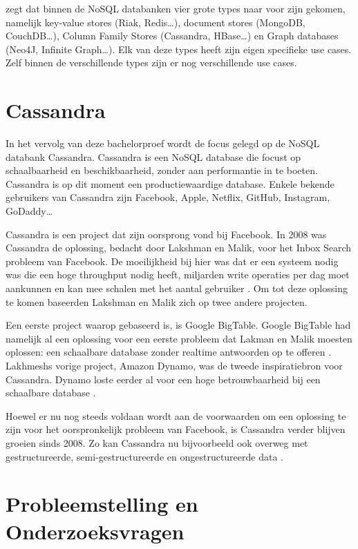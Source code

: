 \cite{Sadalage2014OverviewNoSQL} zegt dat binnen de NoSQL databanken vier grote types naar voor zijn gekomen, namelijk key-value stores (Riak, Redis\dots), document stores (MongoDB, CouchDB\dots), Column Family Stores (Cassandra, HBase\dots) en Graph databases (Neo4J, Infinite Graph\dots).
Elk van deze types heeft zijn eigen specifieke use cases.
Zelf binnen de verschillende types zijn er nog verschillende use cases.

\section{Cassandra}

In het vervolg van deze bachelorproef wordt de focus gelegd op de NoSQL databank Cassandra.
Cassandra is een NoSQL database die focust op schaalbaarheid en beschikbaarheid, zonder aan performantie in te boeten.
Cassandra is op dit moment een productiewaardige database.
Enkele bekende gebruikers van Cassandra zijn Facebook, Apple, Netflix, GitHub, Instagram, GoDaddy\dots

Cassandra is een project dat zijn oorsprong vond bij Facebook.
In 2008 was Cassandra de oplossing, bedacht door Lakshman en Malik, voor het Inbox Search probleem van Facebook.
De moeilijkheid bij hier was dat er een systeem nodig was die een hoge throughput nodig heeft, miljarden write operaties per dag moet aankunnen en kan mee schalen met het aantal gebruiker \citep{lakshman2010cassandra}.
Om tot deze oplossing te komen baseerden Lakshman en Malik zich op twee andere projecten.

Een eerste project waarop gebaseerd is, is Google BigTable.
Google BigTable had namelijk al een oplossing voor een eerste probleem dat Lakman en Malik moesten oplossen: een schaalbare database zonder realtime antwoorden op te offeren \citep{chang2008bigtable}.
Lakhmeshs vorige project, Amazon Dynamo, was de tweede inspiratiebron voor Cassandra.
Dynamo loste eerder al voor een hoge betrouwbaarheid bij een schaalbare database \citep{decandia2007dynamo}.

Hoewel er nu nog steeds voldaan wordt aan de voorwaarden om een oplossing te zijn voor het oorspronkelijk probleem van Facebook, is Cassandra verder blijven groeien sinds 2008.
Zo kan Cassandra nu bijvoorbeeld ook overweg met gestructureerde, semi-gestructureerde en ongestructureerde data \citep{kan2014cassandra}.

\section{Probleemstelling en Onderzoeksvragen}
\label{sec:onderzoeksvragen}

